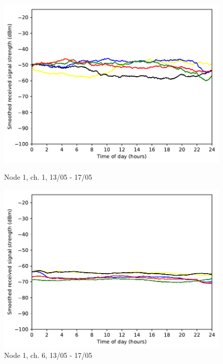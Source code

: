 \documentclass[a4paper, 11pt]{article}
\begin{document}
\begin{figure}[!h]
\begin{minipage}{0.47\textwidth}
    \centering
	\includegraphics[width=\textwidth]{images/2_4_GHz/node1_2017-05-17_chan1_image}
    \caption{Node 1, ch. 1, 13/05 - 17/05} \label{node1-1}
\end{minipage}\hfill
\begin{minipage}{0.47\textwidth}
    \centering
	\includegraphics[width=\textwidth]{images/2_4_GHz/node1_2017-05-17_chan6_image}
    \caption{Node 1, ch. 6, 13/05 - 17/05} \label{node1-6}
\end{minipage}\hfill
\end{figure}
\end{document}
